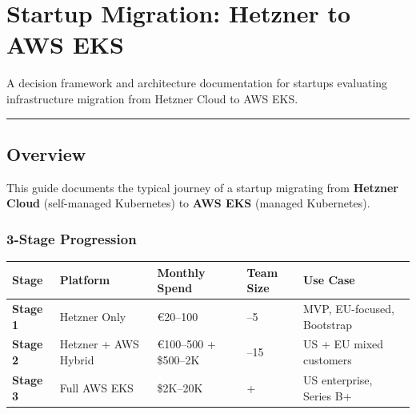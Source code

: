 \section{Startup Migration: Hetzner to AWS
EKS}\label{startup-migration-hetzner-to-aws-eks}

A decision framework and architecture documentation for startups
evaluating infrastructure migration from Hetzner Cloud to AWS EKS.

\begin{center}\rule{0.5\linewidth}{0.5pt}\end{center}

\subsection{Overview}\label{overview}

This guide documents the typical journey of a startup migrating from
\textbf{Hetzner Cloud} (self-managed Kubernetes) to \textbf{AWS EKS}
(managed Kubernetes).

\subsubsection{3-Stage Progression}\label{stage-progression}

{\def\LTcaptype{none} %
\begin{longtable}[]{@{}
  >{\raggedright\arraybackslash}p{}
  >{\raggedright\arraybackslash}p{}
  >{\raggedright\arraybackslash}p{}
  >{\raggedright\arraybackslash}p{}
  >{\raggedright\arraybackslash}p{}@{}}
\toprule\noalign{}
\begin{minipage}[b]{\linewidth}\raggedright
Stage
\end{minipage} & \begin{minipage}[b]{\linewidth}\raggedright
Platform
\end{minipage} & \begin{minipage}[b]{\linewidth}\raggedright
Monthly Spend
\end{minipage} & \begin{minipage}[b]{\linewidth}\raggedright
Team Size
\end{minipage} & \begin{minipage}[b]{\linewidth}\raggedright
Use Case
\end{minipage} \\
\midrule\noalign{}
\endhead
\bottomrule\noalign{}
\endlastfoot
\textbf{Stage 1} & Hetzner Only & €20--100 & 1--5 & MVP, EU-focused,
Bootstrap \\
\textbf{Stage 2} & Hetzner + AWS Hybrid & €100--500 + \$500--2K & 5--15
& US + EU mixed customers \\
\textbf{Stage 3} & Full AWS EKS & \$2K--20K & 15+ & US enterprise,
Series B+ \\
\end{longtable}
}

